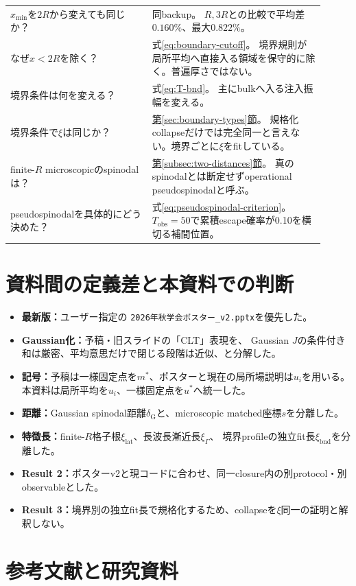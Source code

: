 \documentclass[a4paper,12pt]{ltjsarticle}
\newcommand{\Gauss}{\mathrm G}
\newcommand{\bnd}{\mathrm{bnd}}
\begin{document}
\begin{longtable}{p{0.41\linewidth}p{0.50\linewidth}}
$x_{\min}$を$2R$から変えても同じか？ & 同backup。
$R,3R$との比較で平均差$0.160\%$、最大$0.822\%$。 \\
なぜ$x<2R$を除く？ & 式\eqref{eq:boundary-cutoff}。
境界規則が局所平均へ直接入る領域を保守的に除く。普遍厚さではない。 \\
境界条件は何を変える？ & 式\eqref{eq:T-bnd}。
主にbulkへ入る注入振幅を変える。 \\
境界条件で$\xi$は同じか？ & \hyperref[sec:boundary-types]{第\ref*{sec:boundary-types}節}。
規格化collapseだけでは完全同一と言えない。境界ごとに$\xi$をfitしている。 \\
finite-$R$ microscopicのspinodalは？ & \hyperref[subsec:two-distances]{第\ref*{subsec:two-distances}節}。
真のspinodalとは断定せずoperational pseudospinodalと呼ぶ。 \\
pseudospinodalを具体的にどう決めた？ & 式\eqref{eq:pseudospinodal-criterion}。
$T_{\mathrm{obs}}=50$で累積escape確率が0.10を横切る補間位置。 \\
\bottomrule
\end{longtable}
\normalsize

\clearpage
\section*{資料間の定義差と本資料での判断}

\begin{itemize}
 \item \textbf{最新版：}ユーザー指定の
 \texttt{2026年秋学会ポスター\_v2.pptx}を優先した。
 \item \textbf{Gaussian化：}予稿・旧スライドの「CLT」表現を、
 Gaussian $J$の条件付き和は厳密、平均意思だけで閉じる段階は近似、と分解した。
 \item \textbf{記号：}予稿は一様固定点を$m^*$、ポスターと現在の局所場説明は$u_i$を用いる。
 本資料は局所平均を$u_i$、一様固定点を$u^*$へ統一した。
 \item \textbf{距離：}Gaussian spinodal距離$\delta_{\Gauss}$と、microscopic matched座標$s$を分離した。
 \item \textbf{特徴長：}finite-$R$格子根$\xi_{\mathrm{lat}}$、長波長漸近長$\xi_{\Gamma}$、
 境界profileの独立fit長$\xi_{\bnd}$を分離した。
 \item \textbf{Result 2：}ポスターv2と現コードに合わせ、同一closure内の別protocol・別observableとした。
 \item \textbf{Result 3：}境界別の独立fit長で規格化するため、collapseを$\xi$同一の証明と解釈しない。
\end{itemize}

\clearpage
\section*{参考文献と研究資料}
\nocite{poster2026,proceedings2026,repository2026}
\printbibliography[heading=none]
\end{document}
